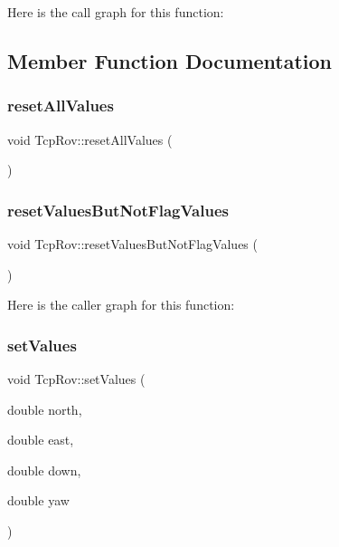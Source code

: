 Here is the call graph for this function\+:


\subsection{Member Function Documentation}
\mbox{\label{class_tcp_rov_aa7314c89fd4e5dcd04e42cf965e8e890}} 
\subsubsection{\texorpdfstring{reset\+All\+Values}{resetAllValues}}
{\footnotesize\ttfamily void Tcp\+Rov\+::reset\+All\+Values (\begin{DoxyParamCaption}{ }\end{DoxyParamCaption})\hspace{0.3cm}{\ttfamily [slot]}}

\mbox{\label{class_tcp_rov_a8d1bbd6025b53b04f03622ee996eb292}} 
\subsubsection{\texorpdfstring{reset\+Values\+But\+Not\+Flag\+Values}{resetValuesButNotFlagValues}}
{\footnotesize\ttfamily void Tcp\+Rov\+::reset\+Values\+But\+Not\+Flag\+Values (\begin{DoxyParamCaption}{ }\end{DoxyParamCaption})\hspace{0.3cm}{\ttfamily [slot]}}

Here is the caller graph for this function\+:
\mbox{\label{class_tcp_rov_a9d719ce6c283d311ac81e89ff56c973a}} 
\subsubsection{\texorpdfstring{set\+Values}{setValues}\hspace{0.1cm}{\footnotesize\ttfamily [1/3]}}
{\footnotesize\ttfamily void Tcp\+Rov\+::set\+Values (\begin{DoxyParamCaption}\item[{double}]{north,  }\item[{double}]{east,  }\item[{double}]{down,  }\item[{double}]{yaw }\end{DoxyParamCaption})\hspace{0.3cm}{\ttfamily [slot]}}


